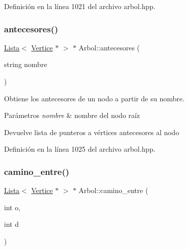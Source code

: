 Definición en la línea 1021 del archivo arbol.\+hpp.

\mbox{\label{classArbol_aa975d5d9cf5fcfc392a8200bd0078d1c}} 
\subsubsection{\texorpdfstring{antecesores()}{antecesores()}\hspace{0.1cm}{\footnotesize\ttfamily [2/2]}}
{\footnotesize\ttfamily \hyperlink{classLista}{Lista}$<$ \hyperlink{classVertice}{Vertice} $\ast$ $>$ $\ast$ Arbol\+::antecesores (\begin{DoxyParamCaption}\item[{string}]{nombre }\end{DoxyParamCaption})}



Obtiene los antecesores de un nodo a partir de su nombre. 


\begin{DoxyParams}{Parámetros}
{\em nombre} & nombre del nodo raíz \\
\hline
\end{DoxyParams}
\begin{DoxyReturn}{Devuelve}
lista de punteros a vértices antecesores al nodo 
\end{DoxyReturn}


Definición en la línea 1025 del archivo arbol.\+hpp.

\mbox{\label{classArbol_accfa606c5f5e67b6ab18c4490075cf39}} 
\subsubsection{\texorpdfstring{camino\+\_\+entre()}{camino\_entre()}\hspace{0.1cm}{\footnotesize\ttfamily [1/2]}}
{\footnotesize\ttfamily \hyperlink{classLista}{Lista}$<$ \hyperlink{classVertice}{Vertice} $\ast$ $>$ $\ast$ Arbol\+::camino\+\_\+entre (\begin{DoxyParamCaption}\item[{int}]{o,  }\item[{int}]{d }\end{DoxyParamCaption})}



